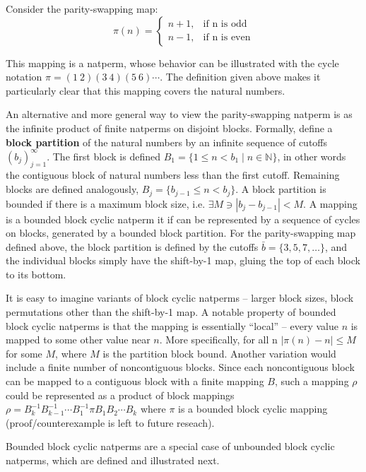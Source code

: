 \documentclass[12pt,reqno]{article}
\begin{document}
Consider the parity-swapping map:
\begin{equation}
    \pi(n) = \begin{cases}
        n + 1, & \text{if n is odd} \\
        n - 1, & \text{if n is even}
    \end{cases}
\end{equation}

This mapping is a natperm, whose behavior can be illustrated with the cycle notation $\pi = (1 \ 2)(3 \ 4)(5 \ 6)\cdots$. The definition given above makes it particularly clear that this mapping covers the natural numbers.

An alternative and more general way to view the parity-swapping natperm is as the infinite product of finite natperms on disjoint blocks. Formally, define a \textbf{block partition} of the natural numbers by an infinite sequence of cutoffs $({b_j})_{j=1}^{\infty}$. The first block is defined $B_1 = \{ 1 \leq n < b_1 \; | \; n \in \mathbb{N} \}$, in other words the contiguous block of natural numbers less than the first cutoff. Remaining blocks are defined analogously,  $B_j = \{ b_{j-1} \leq n < b_j \}$. A block partition is bounded if there is a maximum block size, i.e. $\exists M \ni |b_j - b_{j-1}| < M$. A mapping is a bounded block cyclic natperm it if can be represented by a sequence of cycles on blocks, generated by a bounded block partition. For the parity-swapping map defined above, the block partition is defined by the cutoffs $\bar{b} = \{ 3, 5, 7, \ldots \}$, and the individual blocks simply have the shift-by-1 map, gluing the top of each block to its bottom. 

It is easy to imagine variants of block cyclic natperms -- larger block sizes, block permutations other than the shift-by-1 map. A notable property of bounded block cyclic natperms is that the mapping is essentially ``local'' -- every value $n$ is mapped to some other value near $n$. More specifically, for all n $|\pi(n) - n| \leq M$ for some $M$, where $M$ is the partition block bound. Another variation would include a finite number of noncontiguous blocks. Since each noncontiguous block can be mapped to a contiguous block with a finite mapping $B$, such a mapping $\rho$ could be represented as a product of block mappings $\rho = B_k^{-1} B_{k-1}^{-1} \cdots B_1^{-1} \pi B_1 B_2 \cdots B_k$ where $\pi$ is a bounded block cyclic mapping (proof/counterexample is left to future reseach).

Bounded block cyclic natperms are a special case of unbounded block cyclic natperms, which are defined and illustrated next.
\end{document}
